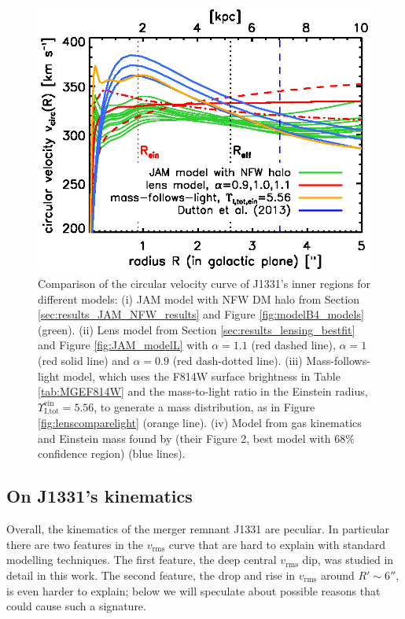 \documentclass[useAMS,usenatbib]{mnras}
\begin{document}
\begin{figure}
\centering
\includegraphics[width=0.9\linewidth]{fig/B4_jam_profiles_errors_short_vcirc.ps}
\caption{Comparison of the circular velocity curve of J1331's inner regions for different models: (i) JAM model with NFW DM halo from Section \ref{sec:results_JAM_NFW_results} and Figure \ref{fig:modelB4_models} (green). (ii) Lens model from Section \ref{sec:results_lensing_bestfit} and Figure \ref{fig:JAM_modelL} with $\alpha = 1.1$ (red dashed line), $\alpha = 1$ (red solid line) and $\alpha=0.9$ (red dash-dotted line). (iii) Mass-follows-light model, which uses the F814W surface brightness in Table \ref{tab:MGEF814W} and the mass-to-light ratio in the Einstein radius, $\Upsilon^\text{ein}_\text{I,tot} = 5.56$, to generate a mass distribution, as in Figure \ref{fig:lenscomparelight} (orange line).  (iv) Model from gas kinematics and Einstein mass found by \citet{SWELLSV} (their Figure 2, best model with 68\% confidence region) (blue lines).}
\label{fig:vcirc_comparison}
\end{figure}

\subsection{On J1331's kinematics} \label{sec:discussion_kinematics}

Overall, the kinematics of the merger remnant J1331 are peculiar. In particular there are two features in the $v_\text{rms}$ curve that are hard to explain with standard modelling techniques. The first feature, the deep central $v_\text{rms}$ dip, was studied in detail in this work. The second feature, the drop and rise in $v_\text{rms}$ around $R'\sim6''$, is even harder to explain; below we will speculate about possible reasons that could cause such a signature.
\end{document}
